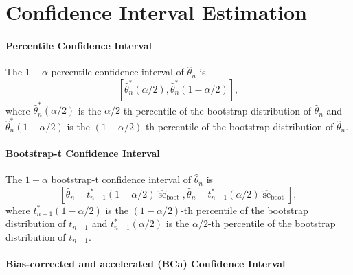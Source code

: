 \section{Confidence Interval Estimation}

\paragraph{Percentile Confidence Interval}

The \(1-\alpha\) percentile confidence interval of \(\hat{\theta}_{n}\) is
\begin{equation}
	\left[\hat{\theta}_{n}^{*}\left(\alpha/2\right),\hat{\theta}_{n}^{*}\left(1-\alpha/2\right)\right],
\end{equation}
where \(\hat{\theta}_{n}^{*}\left(\alpha/2\right)\) is the \(\alpha/2\)-th percentile of the bootstrap distribution of \(\hat{\theta}_{n}\) and \(\hat{\theta}_{n}^{*}\left(1-\alpha/2\right)\) is the \(\left(1-\alpha/2\right)\)-th percentile of the bootstrap distribution of \(\hat{\theta}_{n}\).

\paragraph{Bootstrap-t Confidence Interval}

The \(1-\alpha\) bootstrap-t confidence interval of \(\hat{\theta}_{n}\) is
\begin{equation}
	\left[\hat{\theta}_{n}-t_{n-1}^{*}\left(1-\alpha/2\right)\widehat{\operatorname{se}}_{\text{boot}},\hat{\theta}_{n}-t_{n-1}^{*}\left(\alpha/2\right)\widehat{\operatorname{se}}_{\text{boot}}\right],
\end{equation}
where \(t_{n-1}^{*}\left(1-\alpha/2\right)\) is the \(\left(1-\alpha/2\right)\)-th percentile of the bootstrap distribution of \(t_{n-1}\) and \(t_{n-1}^{*}\left(\alpha/2\right)\) is the \(\alpha/2\)-th percentile of the bootstrap distribution of \(t_{n-1}\).

\paragraph{Bias-corrected and accelerated (BCa) Confidence Interval}

